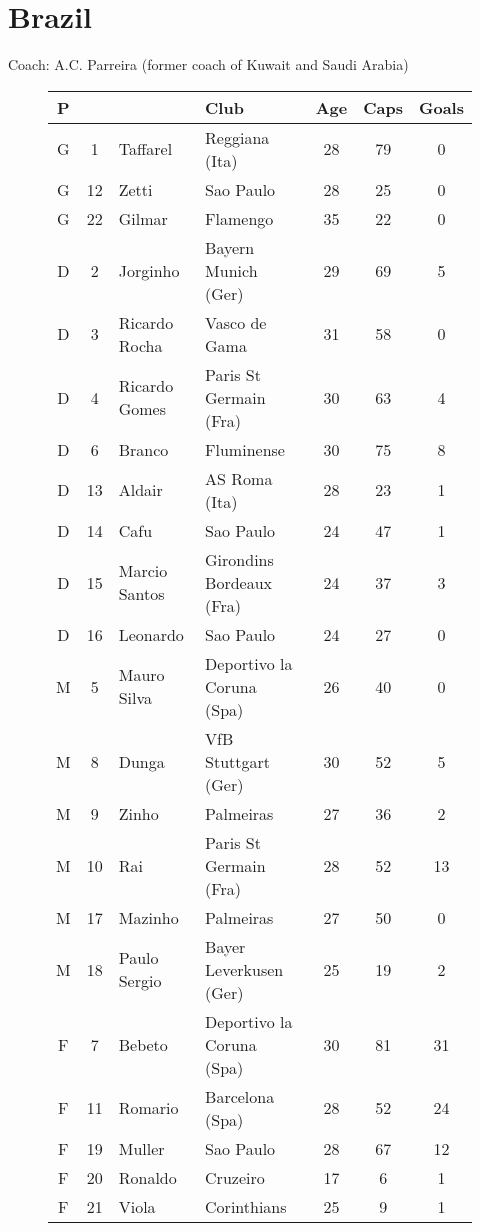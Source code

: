\chapter{Brazil}
\newline
\newline
Coach: A.C. Parreira (former coach of Kuwait and Saudi Arabia)
\begin{figure}[H]
\begin{tabular}{c c l l c c c}
P & & & Club & Age & Caps & Goals \\ \hline
G & 1 & Taffarel & Reggiana (Ita) & 28 & 79 & 0 \\
G & 12 & Zetti & Sao Paulo & 28 & 25 & 0 \\
G & 22 & Gilmar & Flamengo & 35 & 22 & 0 \\ \hline
D & 2 & Jorginho & Bayern Munich (Ger) & 29 & 69 & 5 \\
D & 3 & Ricardo Rocha & Vasco de Gama & 31 & 58 & 0 \\
D & 4 & Ricardo Gomes & Paris St Germain (Fra) & 30 & 63 & 4 \\
D & 6 & Branco & Fluminense & 30 & 75 & 8 \\
D & 13 & Aldair & AS Roma (Ita) & 28 & 23 & 1 \\
D & 14 & Cafu & Sao Paulo & 24 & 47 & 1 \\
D & 15 & M{\’a}rcio Santos & Girondins Bordeaux (Fra) & 24 & 37 & 3 \\
D & 16 & Leonardo & Sao Paulo & 24 & 27 & 0 \\ \hline
M & 5 & Mauro Silva & Deportivo la Coruna (Spa) & 26 & 40 & 0 \\
M & 8 & Dunga &  VfB Stuttgart (Ger) & 30 & 52 & 5 \\
M & 9 & Zinho & Palmeiras & 27 & 36 & 2 \\
M & 10 & Rai & Paris St Germain (Fra) & 28 & 52 & 13 \\
M & 17 & Mazinho & Palmeiras & 27 & 50 & 0 \\
M & 18 & Paulo Sergio & Bayer Leverkusen (Ger) & 25 & 19 & 2 \\ \hline
F & 7 & Bebeto & Deportivo la Coruna (Spa) & 30 & 81 & 31 \\
F & 11 & Rom{\’a}rio & Barcelona (Spa) & 28 & 52 & 24 \\
F & 19 & Muller & Sao Paulo & 28 & 67 & 12 \\
F & 20 & Ronaldo & Cruzeiro & 17 & 6 & 1 \\
F & 21 & Viola & Corinthians & 25 & 9 & 1 \\ \hline
\end{tabular}
\end{figure}
